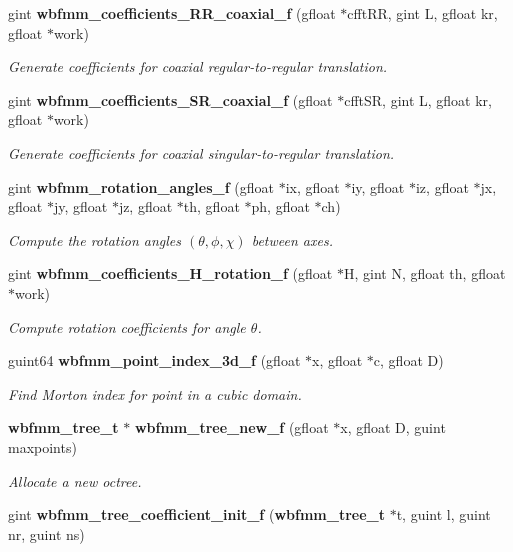 \begin{DoxyCompactItemize}
gint {\bf wbfmm\+\_\+coefficients\+\_\+\+R\+R\+\_\+coaxial\+\_\+f} (gfloat $\ast$cfft\+R\+R, gint L, gfloat kr, gfloat $\ast$work)
\begin{DoxyCompactList}\small\item\em Generate coefficients for coaxial regular-\/to-\/regular translation. \end{DoxyCompactList}\item 
gint {\bf wbfmm\+\_\+coefficients\+\_\+\+S\+R\+\_\+coaxial\+\_\+f} (gfloat $\ast$cfft\+S\+R, gint L, gfloat kr, gfloat $\ast$work)
\begin{DoxyCompactList}\small\item\em Generate coefficients for coaxial singular-\/to-\/regular translation. \end{DoxyCompactList}\item 
gint {\bf wbfmm\+\_\+rotation\+\_\+angles\+\_\+f} (gfloat $\ast$ix, gfloat $\ast$iy, gfloat $\ast$iz, gfloat $\ast$jx, gfloat $\ast$jy, gfloat $\ast$jz, gfloat $\ast$th, gfloat $\ast$ph, gfloat $\ast$ch)
\begin{DoxyCompactList}\small\item\em Compute the rotation angles $(\theta,\phi,\chi)$ between axes. \end{DoxyCompactList}\item 
gint {\bf wbfmm\+\_\+coefficients\+\_\+\+H\+\_\+rotation\+\_\+f} (gfloat $\ast$H, gint N, gfloat th, gfloat $\ast$work)
\begin{DoxyCompactList}\small\item\em Compute rotation coefficients for angle $\theta$. \end{DoxyCompactList}\item 
guint64 {\bf wbfmm\+\_\+point\+\_\+index\+\_\+3d\+\_\+f} (gfloat $\ast$x, gfloat $\ast$c, gfloat D)
\begin{DoxyCompactList}\small\item\em Find Morton index for point in a cubic domain. \end{DoxyCompactList}\item 
{\bf wbfmm\+\_\+tree\+\_\+t} $\ast$ {\bf wbfmm\+\_\+tree\+\_\+new\+\_\+f} (gfloat $\ast$x, gfloat D, guint maxpoints)
\begin{DoxyCompactList}\small\item\em Allocate a new octree. \end{DoxyCompactList}\item 
gint {\bf wbfmm\+\_\+tree\+\_\+coefficient\+\_\+init\+\_\+f} ({\bf wbfmm\+\_\+tree\+\_\+t} $\ast$t, guint l, guint nr, guint ns)

\end{DoxyCompactItemize}
